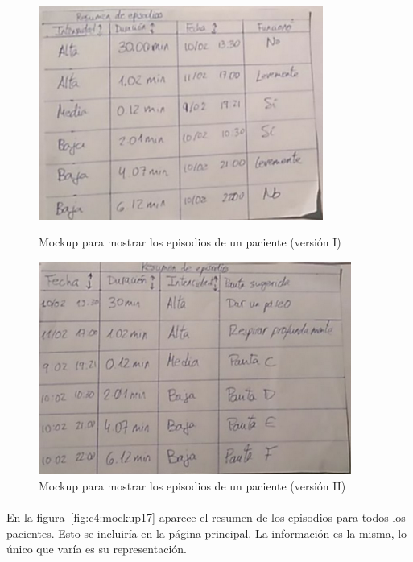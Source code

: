 \begin{figure}
    \centering
    \begin{minipage}{.45\textwidth}
        \centering
        \includegraphics[width=0.8\linewidth, height=7cm]{Imagenes/anxA7-1.png}
        \caption[Mockup para mostrar los episodios de un paciente (versión I)]{Mockup para mostrar los episodios de un paciente (versión I)}
        \label{fig:c4:mockup13}
    \end{minipage}
    \hfill\vline\hfill
    \begin{minipage}{.45\textwidth}
        \centering
        \includegraphics[width=0.8\linewidth, height=7cm]{Imagenes/anxA7-2.png}
        \caption[Mockup para mostrar los episodios de un paciente (versión II)]{Mockup para mostrar los episodios de un paciente (versión II)}
        \label{fig:c4:mockup14}
    \end{minipage}
\end{figure}

\paragraph{}
En la figura~\ref{fig:c4:mockup17} aparece el resumen de los episodios para todos los pacientes. Esto se incluiría en la página principal. La información es la misma, lo único que varía es su representación.

